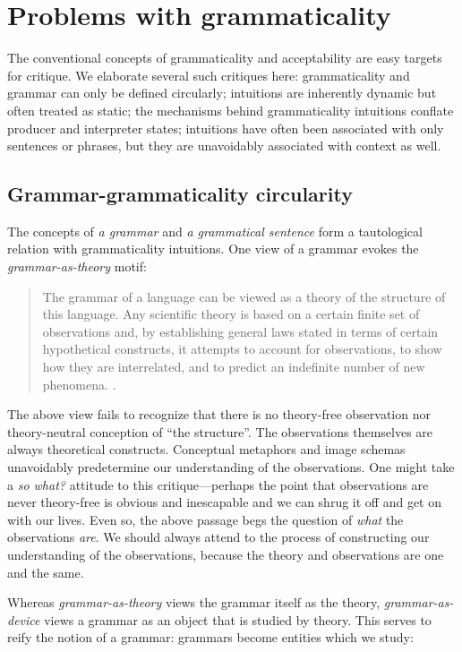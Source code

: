\section{Problems with grammaticality}

The conventional concepts of grammaticality and acceptability are easy targets for critique. We elaborate several such critiques here: grammaticality and grammar can only be defined circularly; intuitions are inherently dynamic but often treated as static; the mechanisms behind grammaticality intuitions conflate producer and interpreter states; intuitions have often been associated with only sentences or phrases, but they are unavoidably associated with context as well.

\subsection{Grammar-grammaticality circularity}

The concepts of \textit{a grammar} and \textit{a grammatical sentence} form a tautological relation with grammaticality intuitions. One view of a grammar evokes the \textit{grammar-as-theory} motif:

\begin{quote}
The grammar of a language can be viewed as a theory of the structure of this language. Any scientific theory is based on a certain finite set of observations and, by establishing general laws stated in terms of certain hypothetical constructs, it attempts to account for observations, to show how they are interrelated, and to predict an indefinite number of new phenomena. \citep[113]{Chomsky1956}.
\end{quote}

  The above view fails to recognize that there is no theory-free observation nor theory-neutral conception of “the structure”. The observations themselves are always theoretical constructs. Conceptual metaphors and image schemas unavoidably predetermine our understanding of the observations. One might take a \textit{so what?} attitude to this critique—perhaps the point that observations are never theory-free is obvious and inescapable and we can shrug it off and get on with our lives. Even so, the above passage begs the question of \textit{what} the observations \textit{are}. We should always attend to the process of constructing our understanding of the observations, because the theory and observations are one and the same.

  Whereas \textit{grammar-as-theory} views the grammar itself as the theory, \textit{grammar-as-device} views a grammar as an object that is studied by theory. This serves to reify the notion of a grammar: grammars become entities which we study:

